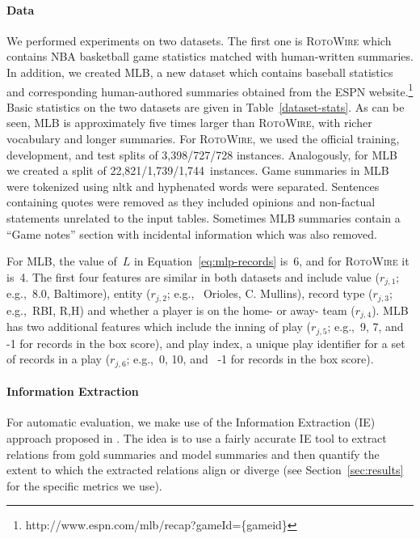 \documentclass[11pt,a4paper]{article}
\newcommand{\lform}[1]{\textsf{\scriptsize{#1}}}
\begin{document}
\paragraph{Data}
We performed experiments on two datasets. The first one is
\textsc{RotoWire} \cite{D17-1239} which contains NBA basketball game
statistics matched with human-written summaries. In addition, we
created MLB, a new dataset which contains baseball statistics and
corresponding human-authored summaries obtained from the ESPN
website.\footnote{http://www.espn.com/mlb/recap?gameId=\{gameid\}}
Basic statistics on the two datasets are given in
Table~\ref{dataset-stats}. As can be seen, MLB is approximately five
times larger than \textsc{RotoWire}, with richer vocabulary and longer
summaries. For \textsc{RotoWire}, we used the official training,
development, and test splits of 3,398/727/728 instances.  Analogously,
for MLB we created a split of 22,821/1,739/1,744~instances. Game
summaries in MLB were tokenized using nltk and hyphenated words were
separated. Sentences containing quotes were removed as they included
opinions and non-factual statements unrelated to the input
tables. Sometimes MLB summaries contain a ``Game notes'' section with
incidental information which was also removed.


For MLB, the value of~$L$ in Equation~\eqref{eq:mlp-records} is~6, and
for \textsc{RotoWire} it is~4. The first four features are similar in
both datasets and include value ($r_{j,1}$; e.g.,~\lform{\small 8.0},
\lform{\small Baltimore}), entity ($r_{j,2}$; e.g.,~\lform{\small
  Orioles}, \lform{\small C. Mullins}), record type ($r_{j,3}$;
e.g.,~\lform{\small RBI}, \lform{\small R},\lform{\small H}) and
whether a player is on the home- or away- team ($r_{j,4}$).  MLB has
two additional features which include the inning of play ($r_{j,5}$;
e.g.,~\lform{\small 9}, \lform{\small 7}, and \lform{\small -1} for
records in the box score), and play index, a unique play identifier
for a set of records in a play ($r_{j,6}$; e.g.,~\lform{\small 0},
\lform{\small 10}, and ~\lform{\small -1} for records in the box
score).

\paragraph{Information Extraction}
For automatic evaluation, we make use of the Information Extraction
(IE) approach proposed in . The idea is to use a
fairly accurate IE tool to extract relations from gold summaries and
model summaries and then quantify the extent to which the extracted
relations align or diverge (see Section~\ref{sec:results} for the
specific metrics we use).
\end{document}
